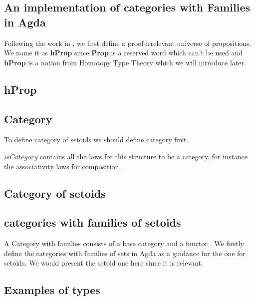 \subsection{An implementation of categories with Families in Agda}

Following the work in \cite{alt:99}, we first define a
proof-irrelevant universe of propositions. We name it as \textbf{hProp}
since \textbf{Prop} is a  reserved word which can't be used and
\textbf{hProp} is a notion from Homotopy Type Theory which we will introduce later.

\subsection{hProp}


\subsection{Category}

To define category of setoids we should define category first.



$isCategory$ contains all the laws for this structure to be a category, for instance the
associativity laws for composition.

\subsection{Category of setoids}





\subsection{categories with families of setoids}


A Category with families consists of a base category and a functor
\cite{clairambault2005categories}. We firstly define the categories with
families of sets in Agda  as a guidance for the one for setoids. We
would present the setoid one here since it is relevant.



\subsection{Examples of types}



